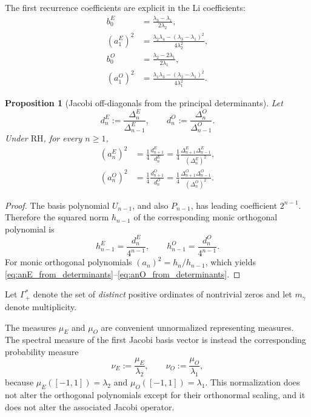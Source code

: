 \documentclass[preprint,12pt]{elsarticle}
\numberwithin{equation}{section}
\theoremstyle{plain}
\newtheorem{proposition}[theorem]{Proposition}
\theoremstyle{definition}
\theoremstyle{remark}
\newcommand{\RH}{\mathrm{RH}}
\begin{document}
The first recurrence coefficients are explicit in the Li coefficients:
\begin{align}
b_0^E
&=\frac{\lambda_3-\lambda_1}{2\lambda_2},
\label{eq:b0E}\\
(a_1^E)^2
&=\frac{\lambda_2\lambda_4-(\lambda_3-\lambda_1)^2}{4\lambda_2^2},
\label{eq:a1E}\\
b_0^O
&=\frac{\lambda_2-2\lambda_1}{2\lambda_1},
\label{eq:b0O}\\
(a_1^O)^2
&=\frac{\lambda_1\lambda_3-(\lambda_2-\lambda_1)^2}{4\lambda_1^2}.
\label{eq:a1O}
\end{align}

\begin{proposition}[Jacobi off-diagonals from the principal determinants]
\label{prop:jacobi_from_determinants}
Let
\begin{equation}
d_n^E:=\frac{\Delta_n^E}{\Delta_{n-1}^E},
\qquad
d_n^O:=\frac{\Delta_n^O}{\Delta_{n-1}^O}.
\label{eq:pivot_short_notation}
\end{equation}
Under $\RH$, for every $n\ge1$,
\begin{align}
(a_n^E)^2
&=\frac14\frac{d_{n+1}^E}{d_n^E}
=\frac14\frac{\Delta_{n+1}^E\Delta_{n-1}^E}{(\Delta_n^E)^2},
\label{eq:anE_from_determinants}\\
(a_n^O)^2
&=\frac14\frac{d_{n+1}^O}{d_n^O}
=\frac14\frac{\Delta_{n+1}^O\Delta_{n-1}^O}{(\Delta_n^O)^2}.
\label{eq:anO_from_determinants}
\end{align}
\end{proposition}

\begin{proof}
The basis polynomial $U_{n-1}$, and also $P_{n-1}$, has leading coefficient $2^{n-1}$.  Therefore the squared norm $h_{n-1}$ of the corresponding monic orthogonal polynomial is
\begin{equation}
h_{n-1}^E=\frac{d_n^E}{4^{n-1}},
\qquad
h_{n-1}^O=\frac{d_n^O}{4^{n-1}}.
\label{eq:monic_norm_from_pivot}
\end{equation}
For monic orthogonal polynomials $(a_n)^2=h_n/h_{n-1}$, which yields \eqref{eq:anE_from_determinants}--\eqref{eq:anO_from_determinants}.
\end{proof}

Let $\Gamma_+^*$ denote the set of \emph{distinct} positive ordinates of nontrivial zeros and let $m_\gamma$ denote multiplicity.

The measures $\mu_E$ and $\mu_O$ are convenient unnormalized representing measures. The spectral measure of the first Jacobi basis vector is instead the corresponding probability measure
\begin{equation}
\nu_E:=\frac{\mu_E}{\lambda_2},
\qquad
\nu_O:=\frac{\mu_O}{\lambda_1},
\label{eq:normalized_spectral_measures}
\end{equation}
because $\mu_E([-1,1])=\lambda_2$ and $\mu_O([-1,1])=\lambda_1$. This normalization does not alter the orthogonal polynomials except for their orthonormal scaling, and it does not alter the associated Jacobi operator.
\end{document}
